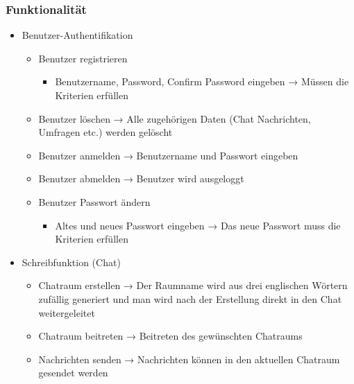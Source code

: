 \subsubsection{Funktionalität}
\begin{itemize}
  \item Benutzer-Authentifikation
  \begin{itemize}
    \item Benutzer registrieren
    \begin{itemize}
      \item Benutzername, Password, Confirm Password eingeben
      \newline 
      → Müssen die Kriterien erfüllen
    \end{itemize}
    \item Benutzer löschen
    \newline
    → Alle zugehörigen Daten (Chat Nachrichten, Umfragen etc.) werden gelöscht
    \item Benutzer anmelden
    \newline
    → Benutzername und Passwort eingeben
    \item Benutzer abmelden
    \newline
    → Benutzer wird ausgeloggt
    \item Benutzer Passwort ändern
    \begin{itemize}
      \item Altes und neues Passwort eingeben
      \newline
      → Das neue Passwort muss die Kriterien erfüllen
    \end{itemize}
  \end{itemize}
  \item Schreibfunktion (Chat)
    \begin{itemize}
      \item Chatraum erstellen
      \newline
      → Der Raumname wird aus drei englischen Wörtern zufällig generiert und man wird nach der Erstellung direkt in den Chat weitergeleitet
      \item Chatraum beitreten
      \newline
      → Beitreten des gewünschten Chatraums
      \item Nachrichten senden
      \newline
      → Nachrichten können in den aktuellen Chatraum gesendet werden

\end{itemize}
\end{itemize}
